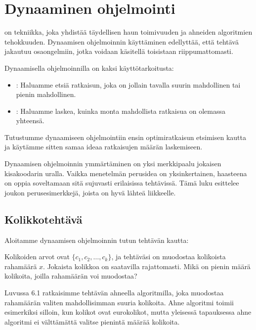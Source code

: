\chapter{Dynaaminen ohjelmointi}


on tekniikka, joka yhdistää täydellisen haun
toimivuuden ja ahneiden algoritmien tehokkuuden.
Dynaamisen ohjelmoinnin käyttäminen edellyttää,
että tehtävä jakautuu osaongelmiin,
jotka voidaan käsitellä toisistaan riippumattomasti.

Dynaamisella ohjelmoinnilla on kaksi käyttötarkoitusta:

\begin{itemize}
\item
{}:
Haluamme etsiä ratkaisun, joka on
jollain tavalla suurin mahdollinen
tai pienin mahdollinen.
\item
{}:
Haluamme laskea, kuinka monta mahdollista
ratkaisua on olemassa yhteensä.
\end{itemize}

Tutustumme dynaamiseen ohjelmointiin ensin
optimiratkaisun etsimisen kautta ja käytämme sitten
samaa ideaa ratkaisujen määrän laskemiseen.

Dynaamisen ohjelmoinnin ymmärtäminen on yksi merkkipaalu
jokaisen kisakoodarin uralla.
Vaikka menetelmän perusidea on yksinkertainen,
haasteena on oppia soveltamaan sitä sujuvasti
erilaisissa tehtävissä.
Tämä luku esittelee joukon
perusesimerkkejä, joista on hyvä lähteä liikkeelle.

\section{Kolikkotehtävä}

Aloitamme dynaamisen ohjelmoinnin tutun tehtävän kautta:

\begin{task}
Kolikoiden arvot ovat $\{c_1,c_2,\ldots,c_k\}$,
ja tehtäväsi on muodostaa kolikoista rahamäärä $x$.
Jokaista kolikkoa on saatavilla rajattomasti.
Mikä on pienin määrä kolikoita,
joilla rahamäärän voi muodostaa?
\end{task}

Luvussa 6.1 ratkaisimme tehtävän ahneella algoritmilla,
joka muodostaa rahamäärän valiten mahdollisimman
suuria kolikoita.
Ahne algoritmi toimii esimerkiksi silloin,
kun kolikot ovat eurokolikot,
mutta yleisessä tapauksessa ahne algoritmi
ei välttämättä valitse pienintä määrää kolikoita.

